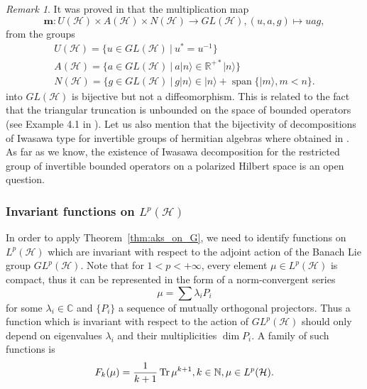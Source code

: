 \documentclass[a4paper,12pt,reqno]{amsart}%
\theoremstyle{definition}
\theoremstyle{remark}
\newtheorem{remark}[theorem]{Remark}
\numberwithin{theorem}{section}
\numberwithin{equation}{section}
\newcommand{\1}{{\bf 1}}
\DeclareMathOperator{\Tr}{\textnormal{Tr}}
\newcommand\C{{\mathbb{C}}}
\begin{document}
\begin{remark}
    It was proved in \cite[Proposition~1.1]{beltita-iwasawa} that the multiplication map
    \[
\textbf{m}:U(\mathcal{H})\times A(\mathcal{H})\times N(\mathcal{H})\rightarrow GL(\mathcal H), (u, a, g)\mapsto uag,
    \]
    from the groups 
    \[
    \begin{array}{l}
    U(\mathcal{H}) = \{u \in GL(\mathcal H)~|~ u^* = u^{-1}\}\\
    A(\mathcal{H}) = \{ a \in GL(\mathcal H)~|~ a|n\rangle \in \mathbb{R}^{+*}|n\rangle\}\\
    N(\mathcal{H}) = \{ g \in GL(\mathcal H)~|~  g|n\rangle \in |n\rangle + \operatorname{span}\{|m\rangle, m<n\}.  
    \end{array}
    \]
    into $ GL(\mathcal H)$
    is bijective but not a diffeomorphism. This is related to the fact that the triangular truncation is unbounded on the space of bounded operators (see Example 4.1 in \cite{davidson}).
Let us also mention that the bijectivity of decompositions of Iwasawa type for invertible groups of hermitian algebras where obtained in \cite[Corollary~3.7]{beltita-neeb2010}. As far as we know, the existence of Iwasawa decomposition for the restricted group of invertible bounded operators on a polarized Hilbert space is an open question.

\end{remark}

\subsubsection{Invariant functions on $L^p(\mathcal H)$}

In order to apply Theorem~\ref{thm:aks_on_G}, we need to identify functions on $L^p(\mathcal H)$ which are invariant with respect to the adjoint action of the Banach Lie group $GL^p(\mathcal H)$. Note that for $1<p<+\infty$, every element $\mu\in L^p(\mathcal H)$ is compact, thus it can be represented in the form of a norm-convergent series
\[ \mu = \sum \lambda_i P_i \]
for some $\lambda_i\in\C$ and $\{P_i\}$ a sequence of mutually orthogonal projectors.
Thus a function which is invariant with respect to the action of $GL^p(\mathcal H)$ should only depend on eigenvalues $\lambda_i$ and their multiplicities $\dim P_i$. A family of such functions is  
\begin{equation}\label{eq:invariant_functions}
F_k(\mu) = \frac{1}{k+1}\Tr \mu^{k+1}, k\in\mathbb{N}, \mu \in L^p(\mathcal H).
\end{equation}
\end{document}
